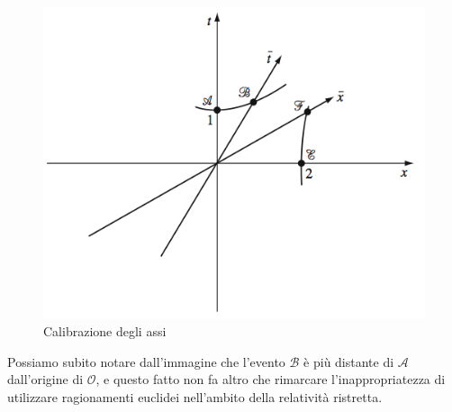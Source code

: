 \documentclass[a4paper,11pt]{book}
\theoremstyle{plain}
\theoremstyle{definition}
\begin{document}
\begin{figure}[!h]
\centering
\includegraphics[scale=0.45]{calibrazione}
\caption{Calibrazione degli assi}
\end{figure}
Possiamo subito notare dall'immagine che l'evento $\mathcal{B}$ è più distante di $\mathcal{A}$ dall'origine di $\mathcal{O}$, e questo fatto non fa altro che rimarcare l'inappropriatezza di utilizzare ragionamenti euclidei nell'ambito della relatività ristretta. 
\newpage
\end{document}
